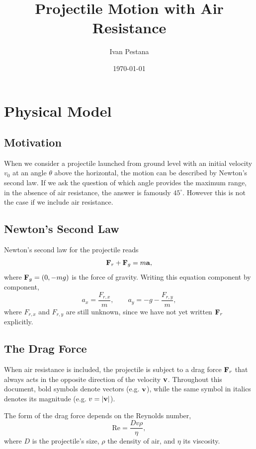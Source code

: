 \documentclass[11pt]{article}
\title{Projectile Motion with Air Resistance}
\author{Ivan Pestana}
\date{\today}
\begin{document}
\maketitle

\section{Physical Model}
\subsection{Motivation}
When we consider a projectile launched from ground level with an initial
velocity \(v_0\) at an angle \(\theta\) above the horizontal, the motion can be
described by Newton's second law. If we ask the question of which angle
provides the maximum range, in the absence of air resistance, the answer is
famously \(45^\circ\). However this is not the case if we include air
resistance.

\subsection{Newton's Second Law}
Newton's second law for the projectile reads
\begin{equation}
\vb{F}_r + \vb{F}_g = m\vb{a},
\end{equation}
where $\vb{F}_g = (0, -mg)$ is the force of gravity. Writing this
equation component by component,
\begin{equation}
    a_x = \frac{F_{r,x}}{m}, \qquad
    a_y = -g - \frac{F_{r,y}}{m},
\end{equation}
where $F_{r,x}$ and $F_{r,y}$ are still unknown, since we have not yet
written $\vb{F}_r$ explicitly.

\subsection{The Drag Force}
When air resistance is included, the projectile is subject to a drag force
$\vb{F}_r$ that always acts in the opposite direction of the velocity $\vb{v}$.
Throughout this document, bold symbols denote vectors (e.g. $\vb{v}$),
while the same symbol in italics denotes its magnitude (e.g.
$v = |\vb{v}|$).

The form of the drag force depends on the Reynolds number,
\begin{equation}
\mathrm{Re} = \frac{Dv\rho}{\eta},
\end{equation}
where $D$ is the projectile's size, $\rho$ the density of air, and
$\eta$ its viscosity.
\end{document}
